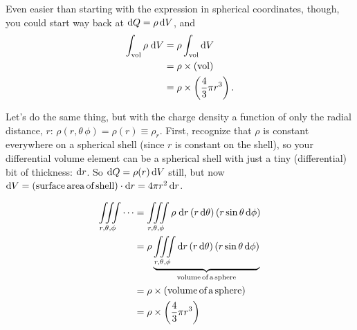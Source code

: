 \documentclass[10pt,letterpaper,twoside]{article}
\begin{document}
Even easier than starting with the expression in spherical coordinates, though, you could start way back at $\text d Q = \rho \, \text d V$, and
\begin{align*}
  \int_{\text{vol}} \rho\;\text d V &= \rho \int_{\text{vol}} \text d V \\
  &= \rho\times (\text{vol}) \\
  &= \rho \times \left( \frac{4}{3}\pi r^3 \right).
\end{align*}

Let's do the same thing, but with the charge density a function of only the radial distance, $r$: $\rho(r,\theta\,\phi)=\rho(r)\equiv\rho_r$.
First, recognize that $\rho$ is constant everywhere on a spherical shell (since $r$ is constant on the shell), so your differential volume element can be a spherical shell with just a tiny (differential) bit of thickness: $\text dr$. So $\text dQ = \rho(r)\,\text d V$ still, but now $\text dV=(\text{surface\,area\,of\,shell})\cdot \text dr = 4\pi r^2\,\text d r$.

\begin{align*}
	\iiint\limits_{r,\theta,\phi} \cdots &= \iiint\limits_{r,\theta,\phi} \rho \; \text d r  \, (r \, \text d \theta) \, (r \sin\theta\,\text d\phi) \\
	&= \rho \underbrace{\iiint\limits_{r,\theta,\phi} \text d r  \, (r \, \text d \theta) \, (r \sin\theta\,\text d\phi)}_\text{volume\,of\,a\,sphere} \\
	 &= \rho \times \left( \text{volume\,of\,a\,sphere} \right) \\
	 &= \rho \times \left( \frac{4}{3}\pi r^3 \right)
\end{align*}
\end{document}
